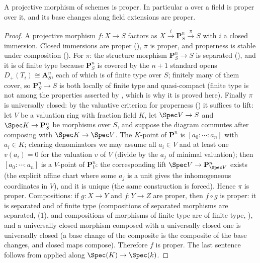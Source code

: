 \begin{lemma}
\label{lem:pc-projective-proper}
A projective morphism of schemes is proper.  In particular a
over a field is proper over it, and its base changes along field
extensions are proper.
\leanok
\end{lemma}
\begin{proof}
\leanok
A projective morphism $f:X\to S$ factors as
$X\xrightarrow{i}\mathbf P^n_S\xrightarrow{\pi}S$ with $i$ a closed
immersion.  Closed immersions are proper
(),
$\pi$ is proper, and properness is stable under composition
().  For
$\pi$: the structure morphism $\mathbf P^n_S\to S$ is separated
(), and it is of finite type
because $\mathbf P^n_S$ is covered by the $n+1$ standard opens
$D_{+}(T_i)\cong\mathbf A^n_S$, each of which is of finite type over $S$;
finitely many of them cover, so $\mathbf P^n_S\to S$ is both locally of
finite type and quasi-compact (finite type is not among the properties
asserted by , which is why it is
proved here).  Finally $\pi$ is universally closed: by the
valuative criterion for
properness () it suffices to
lift: let $V$ be a valuation ring with
fraction field $K$, let $\Spec V\to S$ and
$\Spec K\to\mathbf P^n_S$ be morphisms over $S$, and suppose the
diagram commutes after composing with $\Spec K\to\Spec V$.  The
$K$-point of $\mathbf P^n$ is $[a_0:\cdots:a_n]$ with $a_i\in K$;
clearing denominators we may assume all $a_i\in V$ and at least one
$v(a_i)=0$ for the valuation $v$ of $V$ (divide by the $a_j$ of
minimal valuation); then $[a_0:\cdots:a_n]$ is a $V$-point of
$\mathbf P^n_V$: the corresponding lift $\Spec V\to\mathbf P^n_{\Spec
V}$ exists (the explicit affine chart where some $a_j$ is a unit
gives the inhomogeneous coordinates in $V$), and it is unique (the
same construction is forced).  Hence $\pi$ is proper.  Compositions:
if $g:X\to Y$ and $f:Y\to Z$ are proper, then $f\circ g$ is proper:
it is separated and of finite type (compositions of separated
morphisms are separated, (1), and
compositions of morphisms of finite type are of finite type,
), and a universally closed morphism
composed with a universally closed one is universally closed (a base
change of the composite is the composite of the base changes, and
closed maps compose).  Therefore $f$ is proper.  The last sentence
follows from  applied along
$\Spec(K)\to\Spec(k)$.
\end{proof}





